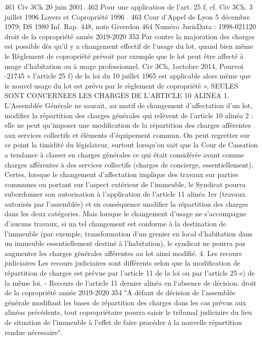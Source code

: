 461 Civ 3\degres Ch 20 juin 2001.
462 Pour une application de l’art. 25 f, cf. Civ 3\degres Ch. 3 juillet 1996 Loyers et Copropriété 1996 .
463 Cour d'Appel de Lyon 5 décembre 1979; DS 1980 Inf. Rap. 448, note Giverdon
464 Numéro JurisData : 1998-021120
droit de la copropriété année 2019-2020
353
Par contre la majoration des charges est possible dès qu’il y a changement effectif de l’usage du lot, quand bien même le Règlement de copropriété prévoit par exemple que le lot peut être affecté à usage d’habitation ou à usage professionnel.
Civ 3\degres Ch, 1\degres octobre 2014, Pourvoi -21745
« l'article 25 f) de la loi du 10 juillet 1965 est applicable alors même que le nouvel usage du lot est prévu par le règlement de copropriété »,
SEULES SONT CONCERNEES LES CHARGES DE L'ARTICLE 10 ALINEA 1.
L'Assemblée Générale ne saurait, au motif de changement d'affectation d'un lot, modifier la répartition des charges générales qui relèvent de l'article 10 alinéa 2 : elle ne peut qu'imposer une modification de la répartition des charges afférentes aux services collectifs et éléments d'équipement commun.
On peut regretter sur ce point la timidité du législateur, surtout lorsqu'on sait que la Cour de Cassation a tendance à classer en charges générales ce qui était considérée avant comme charges afférentes à des services collectifs (charges de concierge, essentiellement).
Certes, lorsque le changement d'affectation implique des travaux sur parties communes ou portant sur l'aspect extérieur de l'immeuble, le Syndicat pourra subordonner son autorisation à l'application de l'article 11 alinéa 1er (travaux autorisés par l'assemblée) et en conséquence modifier la répartition des charges dans les deux catégories.
Mais lorsque le changement d'usage ne s'accompagne d'aucuns travaux, si un tel changement est conforme à la destination de l'immeuble (par exemple, transformation d'un grenier en local d'habitation dans un immeuble essentiellement destiné à l'habitation), le syndicat ne pourra pas augmenter les charges générales afférentes au lot ainsi modifié.
4. Les recours judiciaires
Les recours judiciaires sont différents selon que la modification de répartition de charges est prévue par l’article 11 de la loi ou par l’article 25 e) de la même loi.
- Recours de l'article 11 dernier alinéa en l‘absence de décision.
droit de la copropriété année 2019-2020
354
"A défaut de décision de l'assemblée générale modifiant les bases de répartition des charges dans les cas prévus aux alinéas précédents, tout copropriétaire pourra saisir le tribunal judiciaire du lieu de situation de l'immeuble à l'effet de faire procéder à la nouvelle répartition rendue nécessaire".
